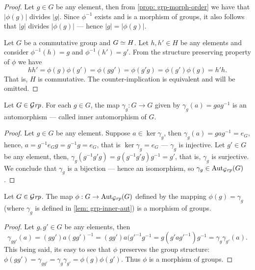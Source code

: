 \begin{proof}
  Let \(g \in G\) be any element, then from \cref{prop: grp-morph-order} we have
  that \(|\phi(g)|\) divides \(|g|\). Since \(\phi^{-1}\) exists and is a
  morphism of groups, it also follows that \(|g|\) divides \(|\phi(g)|\) ---
  hence \(|g| = |\phi(g)|\).

  Let \(G\) be a commutative group and \(G \simeq H\). Let \(h, h' \in H\) be any
  elements and consider \(\phi^{-1}(h) = g\) and \(\phi^{-1}(h') = g'\). From
  the structure preserving property of \(\phi\) we have
  \[
    h h' = \phi(g) \phi(g') = \phi(gg') = \phi(g'g) = \phi(g')\phi(g) = h' h.
  \]
  That is, \(H\) is commutative. The counter-implication is equivalent and will
  be omitted.
\end{proof}

\begin{lemma}\label{lem: grp-inner-aut}
  Let \(G \in {\mathcal{G}\textit{rp}}\). For each \(g \in G\), the map \(\gamma_g: G \to G\) given
  by \(\gamma_g(a) = gag^{-1}\) is an automorphism --- called inner
  automorphism of \(G\).
\end{lemma}

\begin{proof}
  Let \(g \in G\) be any element. Suppose \(a \in \ker\gamma_g\), then
  \(\gamma_g(a) = gag^{-1} = e_G\), hence, \(a = g^{-1} e_G g = g^{-1}g = e_G\),
  that is \(\ker\gamma_g = e_G\) --- \(\gamma_g\) is injective. Let \(g' \in G\)
  be any element, then, \(\gamma_g(g^{-1} g' g) = g (g^{-1} g' g) g^{-1} = g'\),
  that is, \(\gamma_g\) is surjective. We conclude that \(\gamma_g\) is a
  bijection --- hence an isomorphism, so \(\gamma_g \in \operatorname{Aut}_{\mathcal{G}\textit{rp}}(G)\).
\end{proof}

\begin{lemma}
  \label{lem: grp-inner-aut-cor}
  Let \(G \in {\mathcal{G}\textit{rp}}\). The map \(\phi: G \to \operatorname{Aut}_{\mathcal{G}\textit{rp}}(G)\) defined by the
  mapping \(\phi(g) = \gamma_g\) (where \(\gamma_g\) is defined in \cref{lem:
  grp-inner-aut}) is a morphism of groups.
\end{lemma}

\begin{proof}
  Let \(g, g' \in G\) be any elements, then
  \[
    \gamma_{gg'}(a) = (gg')a(gg')^{-1} = (g g') a (g'^{-1} g^{-1}
    = g(g' a g'^{-1}) g^{-1} = \gamma_g \gamma_{g'}(a).
  \]
  This being said, its easy to see that \(\phi\) preserves the group structure:
  \(\phi(gg') = \gamma_{gg'} = \gamma_g \gamma_{g'} = \phi(g) \phi(g')\). Thus
  \(\phi\) is a morphism of groups.
\end{proof}

